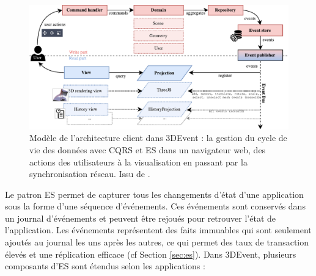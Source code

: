 \begin{figure}[h]
	\centering
	\includegraphics[width=\columnwidth]{eps/cqrs2.pdf}
	\caption[Modèle de l'architecture client dans 3DEvent]{Modèle de l'architecture 
		client dans 3DEvent : la gestion du cycle de vie des données avec 
		\gls{CQRS} 
		et \gls{ES} dans un navigateur web, des actions des utilisateurs à la visualisation 
		en passant par la synchronisation réseau. Issu de \cite{Desprat2017}.}
	\label{fig:cqrs-client}
\end{figure}


Le patron \gls{ES} permet de capturer tous les changements d'état 
d'une application sous la forme d'une séquence d'événements. 
Ces événements sont conservés dans un journal d'événements et peuvent être 
rejoués pour retrouver l'état de l'application. 
Les événements représentent des faits immuables qui sont 
seulement ajoutés au journal les uns après les autres, ce qui permet des taux de 
transaction élevés et une réplication efficace (cf Section 
\ref{sec:es}). Dans 3DEvent, plusieurs composants d'\gls{ES} sont étendus selon 
les applications :


